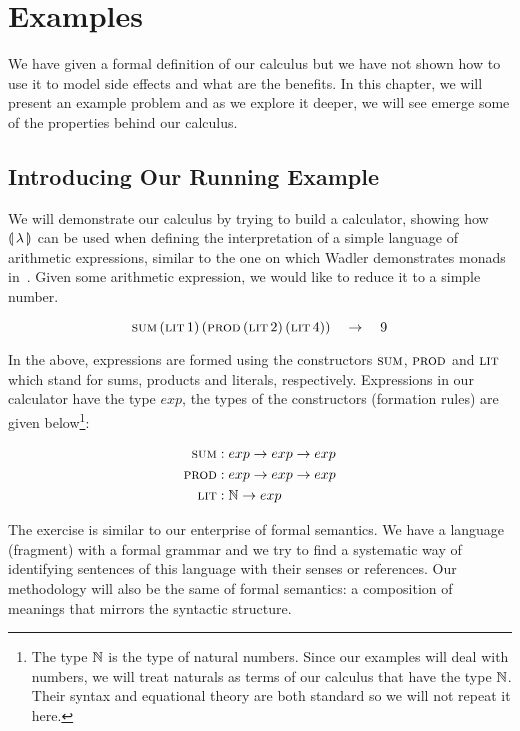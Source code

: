 \chapter{Examples}
\label{chap:examples}

We have given a formal definition of our calculus but we have not shown how
to use it to model side effects and what are the benefits. In this chapter,
we will present an example problem and as we explore it deeper, we will see
emerge some of the properties behind our calculus.

\minitoc

\section{Introducing Our Running Example}

We will demonstrate our calculus by trying to build a calculator, showing
how ${\llparenthesis \, \lambda \, \rrparenthesis}$ can be used when defining the interpretation of a simple
language of arithmetic expressions, similar to the one on which Wadler
demonstrates monads in~\cite{wadler1992essence}. Given some arithmetic
expression, we would like to reduce it to a simple number.

$$
\textsc{sum}\,(\textsc{lit}\,1)\,(\textsc{prod}\,(\textsc{lit}\,2)\,(\textsc{lit}\,4))
\quad \to \quad 9
$$

In the above, expressions are formed using the constructors $\textsc{sum}$,
$\textsc{prod}$ and $\textsc{lit}$ which stand for sums, products and literals,
respectively. Expressions in our calculator have the type $exp$, the types
of the constructors (formation rules) are given below\footnote{The type
  $\mathbb{N}$ is the type of natural numbers. Since our examples will deal with
  numbers, we will treat naturals as terms of our calculus that have the
  type $\mathbb{N}$. Their syntax and equational theory are both standard so we
  will not repeat it here.}:

\begin{align*}
  \textsc{sum} &: exp \to exp \to exp \\
  \textsc{prod} &: exp \to exp \to exp \\
  \textsc{lit} &: \mathbb{N} \to exp
\end{align*}

The exercise is similar to our enterprise of formal semantics. We have a
language (fragment) with a formal grammar and we try to find a systematic
way of identifying sentences of this language with their senses or
references. Our methodology will also be the same of formal semantics: a
composition of meanings that mirrors the syntactic structure.

